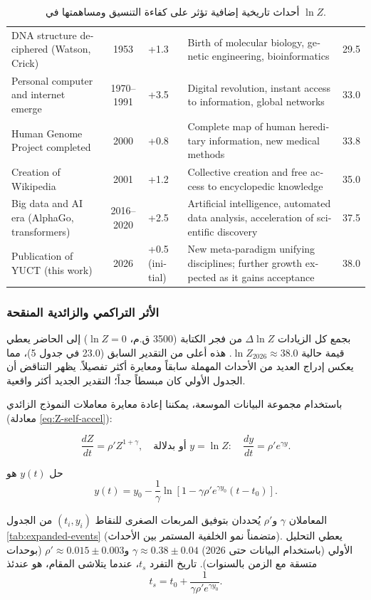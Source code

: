 \documentclass[11pt,a4paper]{article}
\begin{document}
\begin{table}[htbp]
\begin{otherlanguage}{english}
\begin{tabular}{p{3.2cm} c p{2.5cm} p{4.5cm} c}
				DNA structure deciphered (Watson, Crick) & 1953 & +1.3 & Birth of molecular biology, genetic engineering, bioinformatics & 29.5 \\
				Personal computer and internet emerge & 1970–1991 & +3.5 & Digital revolution, instant access to information, global networks & 33.0 \\
				Human Genome Project completed & 2000 & +0.8 & Complete map of human hereditary information, new medical methods & 33.8 \\
				Creation of Wikipedia & 2001 & +1.2 & Collective creation and free access to encyclopedic knowledge & 35.0 \\
				Big data and AI era (AlphaGo, transformers) & 2016–2020 & +2.5 & Artificial intelligence, automated data analysis, acceleration of scientific discovery & 37.5 \\
				Publication of YUCT (this work) & 2026 & +0.5 (initial) & New meta‑paradigm unifying disciplines; further growth expected as it gains acceptance & 38.0 \\
				\bottomrule
			\end{tabular}
		\end{otherlanguage}
		\caption{أحداث تاريخية إضافية تؤثر على كفاءة التنسيق ومساهمتها في \(\ln Z\).}
	\end{table}
	
	\subsubsection{الأثر التراكمي والزائدية المنقحة}
	
	بجمع كل الزيادات \(\Delta \ln Z\) من فجر الكتابة (3500 ق.م، \(\ln Z=0\)) إلى الحاضر يعطي قيمة حالية \(\ln Z_{2026} \approx 38.0\). هذه أعلى من التقدير السابق (23.0 في جدول 5)، مما يعكس إدراج العديد من الأحداث المهملة سابقاً ومعايرة أكثر تفصيلاً. يظهر التناقض أن الجدول الأولي كان مبسطاً جداً؛ التقدير الجديد أكثر واقعية.
	
	باستخدام مجموعة البيانات الموسعة، يمكننا إعادة معايرة معاملات النموذج الزائدي (معادلة \eqref{eq:Z-self-accel}):
	
	\[
	\frac{dZ}{dt} = \rho' Z^{1+\gamma}, \quad \text{أو بدلالة } y = \ln Z: \quad \frac{dy}{dt} = \rho' e^{\gamma y}.
	\]
	
	حل \(y(t)\) هو
	\[
	y(t) = y_0 - \frac{1}{\gamma} \ln\left[1 - \gamma \rho' e^{\gamma y_0} (t - t_0)\right].
	\]
	
	المعاملان \(\gamma\) و\(\rho'\) يُحددان بتوفيق المربعات الصغرى للنقاط \((t_i, y_i)\) من الجدول \ref{tab:expanded-events} (متضمناً نمو الخلفية المستمر بين الأحداث). يعطي التحليل الأولي (باستخدام البيانات حتى 2026) \(\gamma \approx 0.38 \pm 0.04\) و\(\rho' \approx 0.015 \pm 0.003\) (بوحدات متسقة مع الزمن بالسنوات). تاريخ التفرد \(t_s\)، عندما يتلاشى المقام، هو عندئذ
	\[
	t_s = t_0 + \frac{1}{\gamma \rho' e^{\gamma y_0}}.
	\]
	
\end{document}
